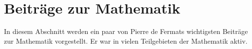 \section{Beiträge zur Mathematik} \label{sec:mathematik}
In diesem Abschnitt werden ein paar von Pierre de Fermats wichtigsten Beiträge zur Mathematik vorgestellt. Er war in vielen Teilgebieten der Mathematik aktiv.





